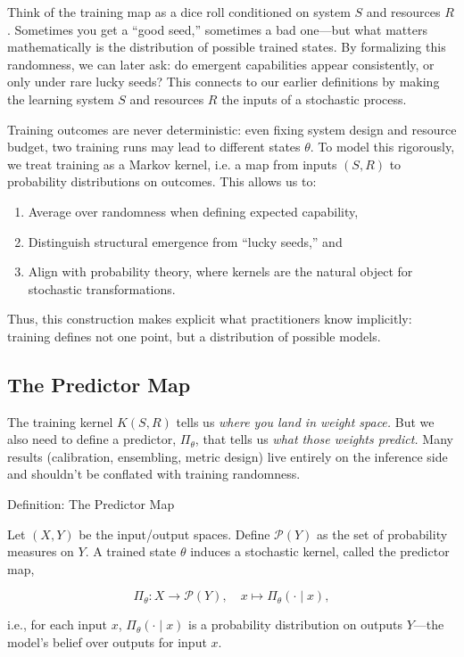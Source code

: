 \documentclass[12pt]{article}
\begin{document}
Think of the training map as a dice roll conditioned on system $S$ and resources $R$. Sometimes you get a “good seed,” sometimes a bad one—but what matters mathematically is the distribution of possible trained states. By formalizing this randomness, we can later ask: do emergent capabilities appear consistently, or only under rare lucky seeds? This connects to our earlier definitions by making the learning system $S$ and resources $R$ the inputs of a stochastic process.

Training outcomes are never deterministic: even fixing system design and resource budget, two training runs may lead to different states $\theta$. To model this rigorously, we treat training as a Markov kernel, i.e. a map from inputs $(S,R)$ to probability distributions on outcomes. This allows us to:

\begin{enumerate}
    \item Average over randomness when defining expected capability,
    \item Distinguish structural emergence from “lucky seeds,” and
    \item Align with probability theory, where kernels are the natural object for stochastic transformations.
\end{enumerate}

Thus, this construction makes explicit what practitioners know implicitly: training defines not one point, but a distribution of possible models.

\subsection{The Predictor Map}

The training kernel $K(S,R)$ tells us \textit{where you land in weight space.} But we also need to define a predictor, $\Pi_\theta$, that tells us \textit{what those weights predict.} Many results (calibration, ensembling, metric design) live entirely on the inference side and shouldn’t be conflated with training randomness.

\begin{statementbox}{Definition: The Predictor Map}

Let $(X,Y)$ be the input/output spaces. Define $\mathcal P (Y)$ as the set of probability measures on $Y$. A trained state $\theta$ induces a stochastic kernel, called the predictor map,

\[
\Pi_\theta:X\to \mathcal P(Y),\quad x\mapsto \Pi_\theta(\cdot \mid x),
\]

i.e., for each input $x$, $\Pi_\theta(\cdot \mid x)$ is a probability distribution on outputs $Y$—the model’s belief over outputs for input $x$.

\end{statementbox}
\end{document}

